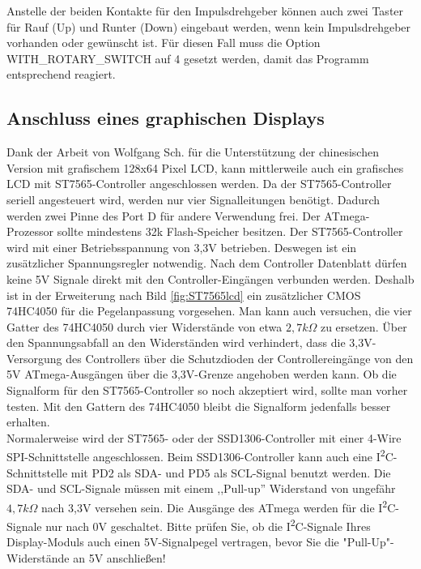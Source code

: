 Anstelle der beiden Kontakte für den Impulsdrehgeber können auch zwei Taster für Rauf (Up) und Runter (Down)
eingebaut werden, wenn kein Impulsdrehgeber vorhanden oder gewünscht ist.
Für diesen Fall muss die Option WITH\_ROTARY\_SWITCH auf 4 gesetzt werden, damit das Programm
entsprechend reagiert.

\subsection{Anschluss eines graphischen Displays}

Dank der Arbeit von Wolfgang Sch. für die Unterstützung der chinesischen Version mit
grafischem 128x64 Pixel LCD, kann mittlerweile auch ein grafisches LCD
mit ST7565-Controller angeschlossen werden. Da der ST7565-Controller seriell angesteuert wird,
werden nur vier Signalleitungen benötigt.
Dadurch werden zwei Pinne des Port D für andere Verwendung frei.
Der ATmega-Prozessor sollte mindestens 32k Flash-Speicher besitzen.
Der ST7565-Controller wird mit einer Betriebsspannung von 3,3V betrieben.
Deswegen ist ein zusätzlicher Spannungsregler notwendig.
Nach dem Controller Datenblatt dürfen keine 5V Signale direkt mit den Controller-Eingängen verbunden
werden. Deshalb ist in der Erweiterung nach Bild \ref{fig:ST7565lcd} ein zusätzlicher CMOS 74HC4050
für die Pegelanpassung vorgesehen. 
Man kann auch versuchen, die vier Gatter des 74HC4050 durch vier Widerstände von etwa \(2,7k\Omega\) zu ersetzen.
Über den Spannungsabfall an den Widerständen wird verhindert, dass die 3,3V-Versorgung des Controllers über die Schutzdioden
der Controllereingänge von den 5V ATmega-Ausgängen über die 3,3V-Grenze angehoben werden kann.
Ob die Signalform für den ST7565-Controller so noch akzeptiert wird, sollte man vorher testen.
Mit den Gattern des 74HC4050 bleibt die Signalform jedenfalls besser erhalten.\\

Normalerweise wird der ST7565- oder der SSD1306-Controller mit einer 4-Wire SPI-Schnittstelle angeschlossen.
Beim SSD1306-Controller kann auch eine I\textsuperscript{2}C-Schnittstelle mit PD2 als SDA- und PD5 als SCL-Signal benutzt werden.
Die SDA- und SCL-Signale müssen mit einem ,,Pull-up'' Widerstand von ungefähr \(4,7k\Omega\) nach 3,3V versehen sein.
Die Ausgänge des ATmega werden für die I\textsuperscript{2}C-Signale nur nach 0V geschaltet.
Bitte prüfen Sie, ob die I\textsuperscript{2}C-Signale Ihres Display-Moduls auch einen 5V-Signalpegel vertragen, bevor Sie die
"Pull-Up"-Widerstände an 5V anschließen!
 
